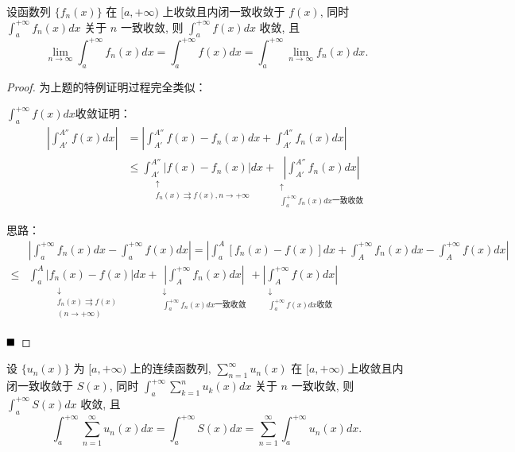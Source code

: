\documentclass[lang=cn,newtx,10pt,scheme=chinese]{elegantbook}
\begin{document}
\begin{proposition}
设函数列 $\{f_n(x)\}$ 在 $[a, +\infty)$ 上收敛且内闭一致收敛于 $f(x)$, 同时 $\int_{a}^{+\infty} f_n(x) dx$ 关于 $n$ 一致收敛, 则 $\int_{a}^{+\infty} f(x) dx$ 收敛, 且
$$ \lim\limits_{n \to \infty} \int_{a}^{+\infty} f_n(x) dx = \int_{a}^{+\infty} f(x) dx = \int_{a}^{+\infty} \lim\limits_{n \to \infty} f_n(x) dx. $$
\end{proposition}

\begin{proof}
为上题的特例证明过程完全类似：

$\int_{a}^{+\infty}f(x)dx$收敛证明：
\begin{align*}
\left|\int_{A'}^{A''} f(x) dx\right| &= \left|\int_{A'}^{A''} f(x) - f_n(x) dx + \int_{A'}^{A''} f_n(x) dx\right| \\
&\le \underset{\substack{\uparrow \\ f_n(x) \rightrightarrows f(x), n \to +\infty}}{\int_{A'}^{A''} |f(x) - f_n(x)| dx} + \underset{\substack{\uparrow \\ \int_{a}^{+\infty} f_n(x) dx \text{一致收敛}}}{\left|\int_{A'}^{A''} f_n(x) dx\right|}
\end{align*}


思路：
\begin{align*}
& \left|\int_{a}^{+\infty} f_n(x) dx - \int_{a}^{+\infty} f(x) dx\right| = \left|\int_{a}^{A} [f_n(x) - f(x)] dx + \int_{A}^{+\infty} f_n(x) dx - \int_{A}^{+\infty} f(x) dx\right| \\
\le & \underset{\substack{\downarrow \\ f_n(x) \rightrightarrows f(x) \\ (n \to +\infty)}}{\int_{a}^{A} |f_n(x) - f(x)| dx} + \underset{\substack{\downarrow \\ \int_{a}^{+\infty} f_n(x) dx \text{一致收敛}}}{\left|\int_{A}^{+\infty} f_n(x) dx\right|} + \underset{\substack{\downarrow \\ \int_{a}^{+\infty} f(x) dx \text{收敛}}}{\left|\int_{A}^{+\infty} f(x) dx\right|}
\end{align*}

$\hfill \blacksquare$

\end{proof}


\begin{example}
设 $\{u_n(x)\}$ 为 $[a, +\infty)$ 上的连续函数列, $\sum_{n=1}^{\infty} u_n(x)$ 在 $[a, +\infty)$ 上收敛且内闭一致收敛于 $S(x)$, 同时 $\int_{a}^{+\infty} \sum_{k=1}^{n} u_k(x) dx$ 关于 $n$ 一致收敛, 则 $\int_{a}^{+\infty} S(x) dx$ 收敛, 且
$$ \int_{a}^{+\infty} \sum_{n=1}^{\infty} u_n(x) dx = \int_{a}^{+\infty} S(x) dx = \sum_{n=1}^{\infty} \int_{a}^{+\infty} u_n(x) dx.  $$
\end{example}
\end{document}
